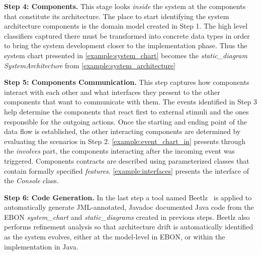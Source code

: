\documentclass[conference]{IEEEtran}
\begin{document}




%
{\bf Step 4: Components.}
This stage looks \emph{inside} the system at the components that constitute
its architecture. The place to start identifying the system architecture components is
the domain model created in Step 1. The high
level classifiers captured there must be transformed into concrete
data types in order to bring the system development closer to the
implementation phase. Thus the system chart presented in
\autoref{example:system_chart} becomes the \emph{static\_diagram
SystemArchitecture} from
\autoref{example:system_architecture}



%
{\bf Step 5: Components Communication.}
This step captures how components interact with each other and
what interfaces they present to the other components that want to
communicate with them. The events identified in Step 3 help
determine the components that react
first to external stimuli and the ones responsible for the
outgoing actions. Once the starting and ending point of the data flow
is established, the other interacting components are determined by
evaluating the scenarios in Step 2. \autoref{example:event_chart_in} 
presents through the \emph{involves} part, the components interacting
after the incoming event was triggered.  
Components contracts are described using parameterized classes that contain
formally specified \emph{features}. \autoref{example:interfaces}  
presents the interface of the \emph{Console} class.



%
{\bf Step 6: Code Generation.}
In the last step a tool named Beetlz~\cite{Darulova09} is applied to 
automatically generate JML-annotated, Javadoc documented Java code 
from the EBON \emph{system\_chart} and
\emph{static\_diagrams} created in previous steps. 
Beetlz also performs refinement analysis so that architecture drift is
automatically identified as the system evolves, either at the
model-level in EBON, or within the implementation in Java.




\end{document}

